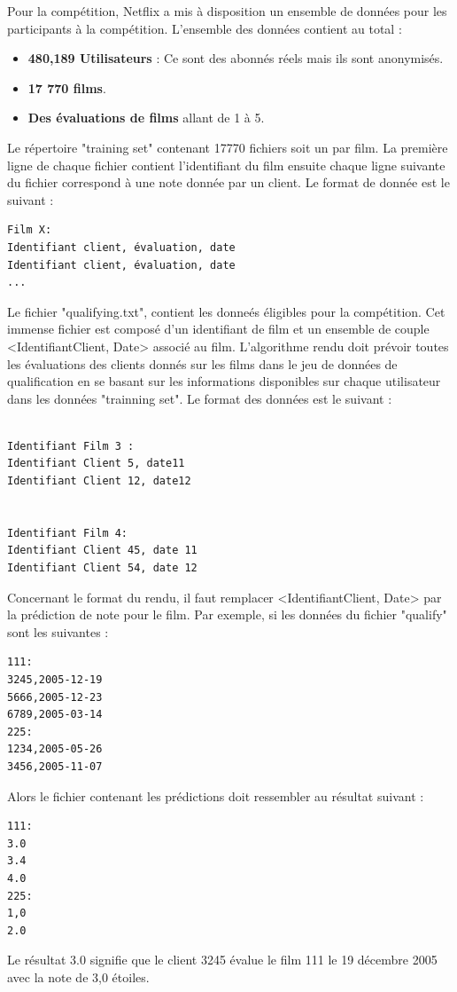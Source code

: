 Pour la compétition, Netflix a mis à disposition un ensemble de données pour les participants à la compétition. L’ensemble des données contient au total : 

\begin{itemize}
    \item \textbf{480,189 Utilisateurs} : Ce sont des abonnés réels mais ils sont anonymisés.
    \vspace{2mm}
    \item \textbf{17 770 films}.
    \vspace{2mm}
    \item \textbf{Des évaluations de films} allant de 1 à 5.
    \vspace{2mm}
\end{itemize}
\vspace{5mm} 
Le répertoire "training set" contenant 17770 fichiers soit un par film. La première ligne de chaque fichier contient l’identifiant du film ensuite chaque ligne suivante du fichier correspond à une note donnée par un client. Le format de donnée est le suivant : 

\begin{verbatim}
Film X:
Identifiant client, évaluation, date
Identifiant client, évaluation, date
...
\end{verbatim}


Le fichier "qualifying.txt", contient les donneés éligibles pour la compétition. Cet immense fichier est composé d’un identifiant de film et un ensemble de couple <IdentifiantClient, Date> associé au film. L’algorithme rendu doit prévoir toutes les évaluations des clients donnés sur les films dans le jeu de données de qualification en se basant sur les informations disponibles sur chaque utilisateur dans les données "trainning set". Le format des données est le suivant : 
\begin{verbatim}

Identifiant Film 3 :
Identifiant Client 5, date11
Identifiant Client 12, date12


Identifiant Film 4:
Identifiant Client 45, date 11
Identifiant Client 54, date 12
\end{verbatim}

Concernant le format du rendu, il faut remplacer <IdentifiantClient, Date> par la prédiction de note pour le film. Par exemple, si les données du fichier "qualify" sont les suivantes :
\vspace{5mm}

\begin{verbatim}
111:
3245,2005-12-19
5666,2005-12-23
6789,2005-03-14
225:
1234,2005-05-26
3456,2005-11-07
\end{verbatim}
Alors le fichier contenant les prédictions doit ressembler au résultat suivant :
\begin{verbatim}
111:
3.0
3.4
4.0
225:
1,0
2.0
\end{verbatim}
Le résultat 3.0 signifie que le client 3245 évalue le film 111 le 19 décembre 2005 avec la note de 3,0 étoiles.




